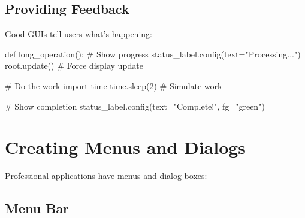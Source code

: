 \documentclass[
  letterpaper,
  DIV=11,
  numbers=noendperiod,
  oneside]{scrreprt}
\newenvironment{Shaded}{}{}
\newcommand{\CommentTok}[1]{\textcolor[rgb]{0.42,0.45,0.49}{#1}}
\newcommand{\DecValTok}[1]{\textcolor[rgb]{0.00,0.36,0.77}{#1}}
\newcommand{\ImportTok}[1]{\textcolor[rgb]{0.01,0.18,0.38}{#1}}
\newcommand{\KeywordTok}[1]{\textcolor[rgb]{0.84,0.23,0.29}{#1}}
\newcommand{\NormalTok}[1]{\textcolor[rgb]{0.14,0.16,0.18}{#1}}
\newcommand{\OperatorTok}[1]{\textcolor[rgb]{0.14,0.16,0.18}{#1}}
\newcommand{\StringTok}[1]{\textcolor[rgb]{0.01,0.18,0.38}{#1}}
\begin{document}
\subsection{Providing Feedback}\label{providing-feedback}

Good GUIs tell users what's happening:

\begin{Shaded}
\begin{Highlighting}[]
\KeywordTok{def}\NormalTok{ long\_operation():}
    \CommentTok{\# Show progress}
\NormalTok{    status\_label.config(text}\OperatorTok{=}\StringTok{"Processing..."}\NormalTok{)}
\NormalTok{    root.update()  }\CommentTok{\# Force display update}
    
    \CommentTok{\# Do the work}
    \ImportTok{import}\NormalTok{ time}
\NormalTok{    time.sleep(}\DecValTok{2}\NormalTok{)  }\CommentTok{\# Simulate work}
    
    \CommentTok{\# Show completion}
\NormalTok{    status\_label.config(text}\OperatorTok{=}\StringTok{"Complete!"}\NormalTok{, fg}\OperatorTok{=}\StringTok{"green"}\NormalTok{)}
\end{Highlighting}
\end{Shaded}

\section{Creating Menus and Dialogs}\label{creating-menus-and-dialogs}

Professional applications have menus and dialog boxes:

\subsection{Menu Bar}\label{menu-bar}
\end{document}
